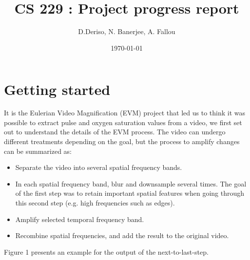 \documentclass[12pt]{article}
\begin{document}
  \title{CS 229 : Project progress report}
  \author{D.Deriso, N. Banerjee, A. Fallou}
  \date{\today}
  \maketitle
  \thispagestyle{empty}



  \section{Getting started}

  It is the Eulerian Video Magnification (EVM) project that led us to think it was possible to extract pulse and oxygen saturation values from a video,
  we first set out to understand the details of the EVM process. The video can undergo different treatments depending on the goal, but the process to amplify changes 
  can be summarized as:

  \begin{itemize}
    \item Separate the video into several spatial frequency bands.
    \item In each spatial frequency band, blur and downsample several times. The goal of the first step was to retain important spatial features when going through this second step (e.g. high frequencies such as edges).
    \item Amplify selected temporal frequency band.
    \item Recombine spatial frequencies, and add the result to the original video.
  \end{itemize}
  Figure 1 presents an example for the output of the next-to-last-step. 
\end{document}
